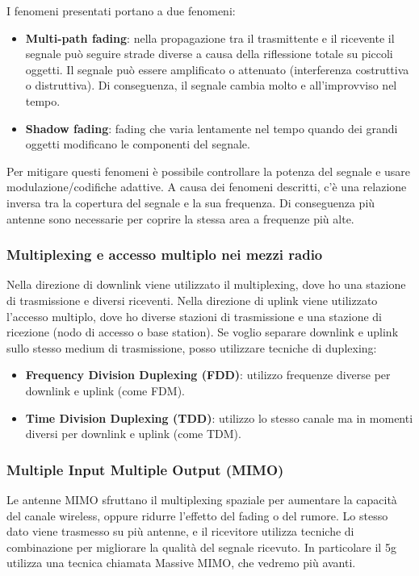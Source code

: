 I fenomeni presentati portano a due fenomeni:
\begin{itemize}
	\item \textbf{Multi-path fading}: nella propagazione tra il trasmittente e il ricevente il segnale può seguire strade diverse a causa della riflessione totale su piccoli oggetti.
	Il segnale può essere amplificato o attenuato (interferenza costruttiva o distruttiva).
	Di conseguenza, il segnale cambia molto e all'improvviso nel tempo.
	\item \textbf{Shadow fading}: fading che varia lentamente nel tempo quando dei grandi oggetti modificano le componenti del segnale.
\end{itemize}
Per mitigare questi fenomeni è possibile controllare la potenza del segnale e usare modulazione/codifiche adattive.
A causa dei fenomeni descritti, c'è una relazione inversa tra la copertura del segnale e la sua frequenza.
Di conseguenza più antenne sono necessarie per coprire la stessa area a frequenze più alte.
\subsubsection{Multiplexing e accesso multiplo nei mezzi radio}
Nella direzione di downlink viene utilizzato il multiplexing, dove ho una stazione di trasmissione e diversi riceventi.
Nella direzione di uplink viene utilizzato l'accesso multiplo, dove ho diverse stazioni di trasmissione e una stazione di ricezione (nodo di accesso o base station).
Se voglio separare downlink e uplink sullo stesso medium di trasmissione, posso utilizzare tecniche di duplexing:
\begin{itemize}
	\item \textbf{Frequency Division Duplexing (FDD)}: utilizzo frequenze diverse per downlink e uplink (come FDM).
	\item \textbf{Time Division Duplexing (TDD)}: utilizzo lo stesso canale ma in momenti diversi per downlink e uplink (come TDM).
\end{itemize}
\subsubsection{Multiple Input Multiple Output (MIMO)}
Le antenne MIMO sfruttano il multiplexing spaziale per aumentare la capacità del canale wireless, oppure ridurre l'effetto del fading o del rumore.
Lo stesso dato viene trasmesso su più antenne, e il ricevitore utilizza tecniche di combinazione per migliorare la qualità del segnale ricevuto.
In particolare il 5g utilizza una tecnica chiamata Massive MIMO, che vedremo più avanti.
